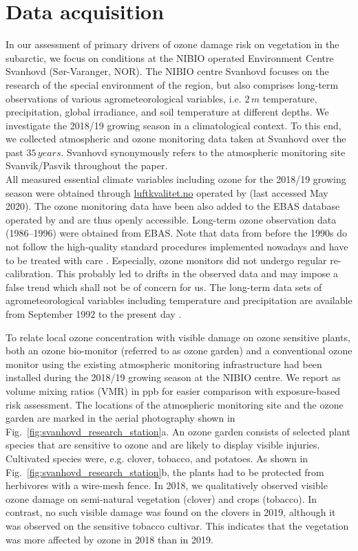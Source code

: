 \documentclass[bg, manuscript]{copernicus}
\begin{document}
\section{Data acquisition}
\label{sec:data}

In our assessment of primary drivers of ozone damage risk on vegetation in the subarctic, we focus on conditions at the NIBIO operated Environment Centre Svanhovd (Sør-Varanger, NOR). The NIBIO centre Svanhovd focuses on the research of the special environment of the region, but also comprises long-term observations of various agrometeorological variables, i.e. $2\,\unit{m}$ temperature, precipitation, global irradiance, and soil temperature at different depths. We investigate the 2018/19 growing season in a climatological context. To this end, we collected atmospheric and ozone monitoring data taken at Svanhovd over the past $35\,\unit{years}$. Svanhovd synonymously refers to the atmospheric monitoring site Svanvik/Pasvik throughout the paper.\\

All measured essential climate variables including ozone for the 2018/19 growing season were obtained through \href{luftkvalitet.no}{luftkvalitet.no} operated by \citet{NILU_AIRQ} (last accessed May 2020). The ozone monitoring data have been also added to the EBAS database operated by \citet{NILU_EBAS} and are thus openly accessible. Long-term ozone observation data (1986--1996) were obtained from EBAS. Note that data from before the 1990s do not follow the high-quality standard procedures implemented nowadays and have to be treated with care \citep{NILU2003}. Especially, ozone monitors did not undergo regular re-calibration. This probably led to drifts in the observed data and may impose a false trend which shall not be of concern for us.
The long-term data sets of agrometeorological variables including temperature and precipitation are available from September 1992 to the present day \citep[LandbruksMeteorologiske Tjeneste][note the station name here is Pasvik]{LMT_NIBIO}.

To relate local ozone concentration \chem{[O_3]} with visible damage on ozone sensitive plants, both an ozone bio-monitor (referred to as ozone garden) and a conventional ozone monitor using the existing atmospheric monitoring infrastructure had been installed during the 2018/19 growing season at the NIBIO centre. We report \chem{[O_3]} as volume mixing ratios (VMR) in \unit{ppb} for easier comparison with exposure-based risk assessment. The locations of the atmospheric monitoring site and the ozone garden are marked in the aerial photography shown in Fig.~\ref{fig:svanhovd_research_station}a. An ozone garden consists of selected plant species that are sensitive to ozone and are likely to display visible injuries. Cultivated species were, e.g. clover, tobacco, and potatoes. As shown in Fig.~\ref{fig:svanhovd_research_station}b, the plants had to be protected from herbivores with a wire-mesh fence. In 2018, we qualitatively observed visible ozone damage on semi-natural vegetation (clover) and crops (tobacco). In contrast, no such visible damage was found on the clovers in 2019, although it was observed on the sensitive tobacco cultivar. This indicates that the vegetation was more affected by ozone in 2018 than in 2019.
\end{document}
